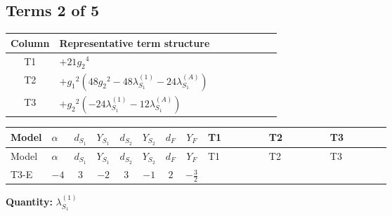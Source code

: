 \documentclass[8pt]{article}
\begin{document}
\begin{landscape}
\subsection*{Terms 2 of 5}
\begin{center}
\begin{tabular}{@{}c >{\raggedright\arraybackslash}p{0.82\linewidth}@{}}
\toprule
Column & Representative term structure \\
\midrule
T1 & \(\displaystyle +21 {g_2}^4\) \\
\midrule
T2 & \(\displaystyle +{g_1}^2 \left(48 {g_2}^2-48 {\lambda_{S_1}^{(1)}}-24 {\lambda_{S_1}^{(A)}}\right)\) \\
\midrule
T3 & \(\displaystyle +{g_2}^2 (-24 {\lambda_{S_1}^{(1)}}-12 {\lambda_{S_1}^{(A)}})\) \\
\midrule
\bottomrule
\end{tabular}
\end{center}
\smallskip
\tiny
\begin{longtable}{@{}llcccccc >{\raggedright\arraybackslash}p{0.21\linewidth} >{\raggedright\arraybackslash}p{0.21\linewidth} >{\raggedright\arraybackslash}p{0.21\linewidth}@{}}
\toprule
Model & $\alpha$ & $d_{S_1}$ & $Y_{S_1}$ & $d_{S_2}$ & $Y_{S_2}$ & $d_F$ & $Y_F$ & T1 & T2 & T3 \\
\midrule
\endfirsthead
\toprule
Model & $\alpha$ & $d_{S_1}$ & $Y_{S_1}$ & $d_{S_2}$ & $Y_{S_2}$ & $d_F$ & $Y_F$ & T1 & T2 & T3 \\
\midrule
\endhead
T3-E & $-4$ & $3$ & $-2$ & $3$ & $-1$ & $2$ & $-\frac{3}{2}$ & \scriptsize\adjustbox{max width=\linewidth}{$\begin{gathered} +21 {g_2}^4\end{gathered}$} & \scriptsize\adjustbox{max width=\linewidth}{$\begin{gathered} +{g_1}^2 \left(48 {g_2}^2-48 {\lambda_{S_1}^{(1)}}-24 {\lambda_{S_1}^{(A)}}\right)\end{gathered}$} & \scriptsize\adjustbox{max width=\linewidth}{$\begin{gathered} +{g_2}^2 (-24 {\lambda_{S_1}^{(1)}}-12 {\lambda_{S_1}^{(A)}})\end{gathered}$} \\
\midrule
\bottomrule
\end{longtable}
\clearpage
\noindent\textbf{Quantity: }$\lambda_{S_1}^{(1)}$\par\smallskip

\end{landscape}
\end{document}
